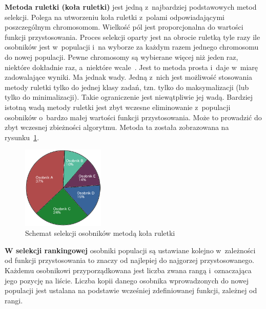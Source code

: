\documentclass[twoside,12pt]{report}
\begin{document}
\textbf{Metoda ruletki (koła ruletki)} jest jedną z~najbardziej podstawowych metod selekcji. Polega na utworzeniu koła ruletki z~polami odpowiadającymi poszczególnym chromosomom. Wielkość pól jest proporcjonalna do wartości funkcji przystosowania. Proces selekcji oparty jest na obrocie ruletką tyle razy ile osobników jest w~populacji i~na wyborze za każdym razem jednego chromosomu do nowej populacji. Pewne chromosomy są wybierane więcej niż jeden raz, niektóre dokładnie raz, a~niektóre wcale~\cite{genetyczne-dane=ewo}. Jest to metoda prosta i~daje w~miarę zadowalające wyniki. Ma jednak wady. Jedną z~nich jest możliwość stosowania metody ruletki tylko do jednej klasy zadań, tzn. tylko do maksymalizacji (lub tylko do minimalizacji). Takie ograniczenie jest niewątpliwie jej wadą. Bardziej istotną wadą metody ruletki jest zbyt wczesne eliminowanie z~populacji osobników o~bardzo małej wartości funkcji przystosowania. Może to prowadzić do zbyt wczesnej zbieżności algorytmu. Metoda ta została zobrazowana na rysunku~\ref{fig:selekcja_ruletka}.

\begin{figure}[htbp]
	\centering
	\includegraphics[width=0.35\textwidth]{img/selekcja_roul}
	\caption{Schemat selekcji osobników metodą koła ruletki} 
	\label{fig:selekcja_ruletka}
\end{figure}

\textbf{W selekcji rankingowej} osobniki populacji są ustawiane kolejno w~zależności od funkcji przystosowania to znaczy od najlepiej do najgorzej przystosowanego. Każdemu osobnikowi przyporządkowana jest liczba zwana
rangą i~oznaczająca jego pozycję na liście. Liczba kopii danego osobnika wprowadzonych do nowej populacji jest ustalana na podstawie wcześniej zdefiniowanej funkcji, zależnej od rangi.
\end{document}
